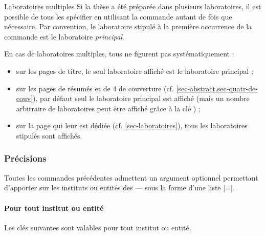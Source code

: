 \begin{dbremark}{Laboratoires multiples}{}
  Si la thèse a été préparée dans plusieurs laboratoires, il est possible de
  tous les spécifier en utilisant la commande  autant de
  fois que nécessaire. Par convention, le laboratoire stipulé à la première
   occurrence de la commande
   est le laboratoire \emph{principal}.

  En cas de laboratoires multiples, tous ne figurent pas systématiquement :
  \begin{itemize}
  \item sur les pages de titre, le seul laboratoire affiché est le
    laboratoire principal ;
  \item sur les pages de résumés et de 4\ieme{} de couverture
    (cf. \vref{sec-abstract,sec-quatr-de-couv}), par défaut seul le laboratoire
    principal est affiché (mais un nombre arbitraire de laboratoires peut être
    affiché grâce à la clé ) ;
  \item sur la page  qui leur est dédiée
    (cf. \vref{sec-laboratoires}), tous les laboratoires stipulés sont
    affichés.
  \end{itemize}
\end{dbremark}

\subsubsection{Précisions}
%

Toutes les commandes précédentes admettent un argument optionnel permettant
d'apporter sur les instituts ou entités des  --- sous la forme
d'une liste |=|.
%
\paragraph{Pour tout institut ou entité}

Les clés suivantes\syntaxeoptions{} sont valables pour tout institut ou entité.

